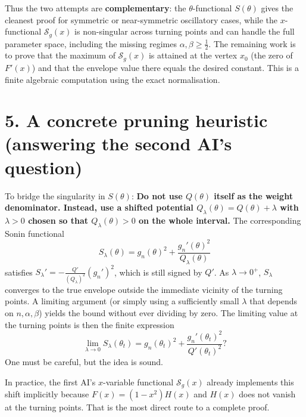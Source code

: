\documentclass[11pt]{article}
\begin{document}
Thus the two attempts are \textbf{complementary}: the \(\theta\)-functional \(S(\theta)\) gives the cleanest proof for symmetric or near-symmetric oscillatory cases, while the \(x\)-functional \(\mathcal{S}_g(x)\) is non-singular across turning points and can handle the full parameter space, including the missing regimes \(\alpha,\beta\ge\frac12\). The remaining work is to prove that the maximum of \(\mathcal{S}_g(x)\) is attained at the vertex \(x_0\) (the zero of \(F'(x)\)) and that the envelope value there equals the desired constant. This is a finite algebraic computation using the exact normalisation.

\section*{5. A concrete pruning heuristic (answering the second AI's question)}

To bridge the singularity in \(S(\theta)\):
\textbf{Do not use \(Q(\theta)\) itself as the weight denominator. Instead, use a shifted potential \(Q_\lambda(\theta)=Q(\theta)+\lambda\) with \(\lambda>0\) chosen so that \(Q_\lambda(\theta)>0\) on the whole interval.} The corresponding Sonin functional
\begin{equation*}
S_\lambda(\theta)=g_n(\theta)^2+\frac{g_n'(\theta)^2}{Q_\lambda(\theta)}
\end{equation*}
satisfies \(S_\lambda' = -\frac{Q'}{(Q_\lambda)^2}(g_n')^2\), which is still signed by \(Q'\). As \(\lambda\to0^+\), \(S_\lambda\) converges to the true envelope outside the immediate vicinity of the turning points. A limiting argument (or simply using a sufficiently small \(\lambda\) that depends on \(n,\alpha,\beta\)) yields the bound without ever dividing by zero. The limiting value at the turning points is then the finite expression
\begin{equation*}
\lim_{\lambda\to0} S_\lambda(\theta_t)
= g_n(\theta_t)^2 + \frac{g_n'(\theta_t)^2}{Q'(\theta_t)^2}\text{?}
\end{equation*}
One must be careful, but the idea is sound.

In practice, the first AI's \(x\)-variable functional \(\mathcal{S}_g(x)\) already implements this shift implicitly because \(F(x)=(1-x^2)H(x)\) and \(H(x)\) does not vanish at the turning points. That is the most direct route to a complete proof.
\end{document}
